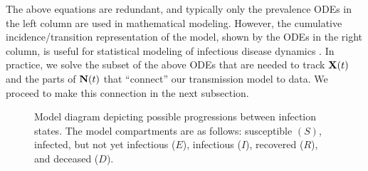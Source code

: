 The above equations are redundant, and typically only the prevalence ODEs in the left column are used in mathematical modeling.
However, the cumulative incidence/transition representation of the model, shown by the ODEs in the right column, is useful for statistical modeling of infectious disease dynamics \citep{breto2011compound}.
In practice, we solve the subset of the above ODEs that are needed to track $\mathbf{X}(t)$ and the parts of $\mathbf{N}(t)$ that ``connect'' our transmission model to data.
We proceed to make this connection in the next subsection.


\begin{figure}
    \centering
\caption{Model diagram depicting possible progressions between infection states. The model compartments are as follows: susceptible $ (S) $, infected, but not yet infectious ($ E $), infectious ($I$), recovered ($ R $), and deceased ($ D $). }
	\label{ch_4:fig:seiird}
\end{figure}

